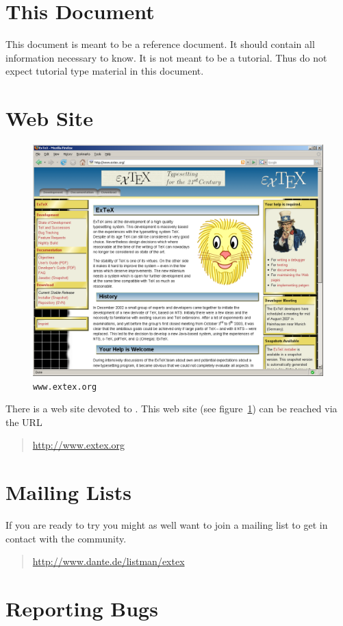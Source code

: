 \section{This Document}

This document is meant to be a reference document. It should contain
all information necessary to know. It is not meant to be a tutorial.
Thus do not expect tutorial type material in this document.


\section{Web Site}

\begin{figure}[!h]
  \centering
  \includegraphics[width=.5\textwidth]{img/www-extex-org}\hfill
  \caption{\texttt{www.extex.org}}
  \label{fig:www.exetex.org}
\end{figure}
There is a web site devoted to \ExTeX. This
web site (see figure~\ref{fig:www.exetex.org}) can be reached via the URL
\begin{quotation}
  \url{http://www.extex.org}
\end{quotation}


\section{Mailing Lists}

If you are ready to try \ExBib{} you might as well want to join a
mailing list to get in contact with the community.

\begin{quotation}
  \url{http://www.dante.de/listman/extex}
\end{quotation}


\section{Reporting Bugs}


